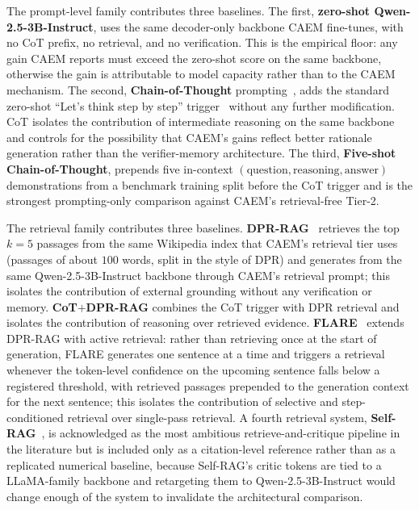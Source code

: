 The prompt-level family contributes three baselines. The first, \textbf{zero-shot Qwen-2.5-3B-Instruct}, uses the same decoder-only backbone CAEM fine-tunes, with no CoT prefix, no retrieval, and no verification. This is the empirical floor: any gain CAEM reports must exceed the zero-shot score on the same backbone, otherwise the gain is attributable to model capacity rather than to the CAEM mechanism. The second, \textbf{Chain-of-Thought} prompting~\cite{wei2022chain}, adds the standard zero-shot ``Let's think step by step'' trigger~\cite{kojima2022large} without any further modification. CoT isolates the contribution of intermediate reasoning on the same backbone and controls for the possibility that CAEM's gains reflect better rationale generation rather than the verifier-memory architecture. The third, \textbf{Five-shot Chain-of-Thought}, prepends five in-context $(\text{question}, \text{reasoning}, \text{answer})$ demonstrations from a benchmark training split before the CoT trigger and is the strongest prompting-only comparison against CAEM's retrieval-free Tier-2.

The retrieval family contributes three baselines. \textbf{DPR-RAG}~\cite{karpukhin-etal-2020-dense, NEURIPS2020_6b493230} retrieves the top $k=5$ passages from the same Wikipedia index that CAEM's retrieval tier uses (passages of about $100$ words, split in the style of DPR) and generates from the same Qwen-2.5-3B-Instruct backbone through CAEM's retrieval prompt; this isolates the contribution of external grounding without any verification or memory. \textbf{CoT$+$DPR-RAG} combines the CoT trigger with DPR retrieval and isolates the contribution of reasoning over retrieved evidence. \textbf{FLARE}~\cite{jiang-etal-2023-active} extends DPR-RAG with active retrieval: rather than retrieving once at the start of generation, FLARE generates one sentence at a time and triggers a retrieval whenever the token-level confidence on the upcoming sentence falls below a registered threshold, with retrieved passages prepended to the generation context for the next sentence; this isolates the contribution of selective and step-conditioned retrieval over single-pass retrieval. A fourth retrieval system, \textbf{Self-RAG}~\cite{asai2024selfrag}, is acknowledged as the most ambitious retrieve-and-critique pipeline in the literature but is included only as a citation-level reference rather than as a replicated numerical baseline, because Self-RAG's critic tokens are tied to a LLaMA-family backbone and retargeting them to Qwen-2.5-3B-Instruct would change enough of the system to invalidate the architectural comparison.


